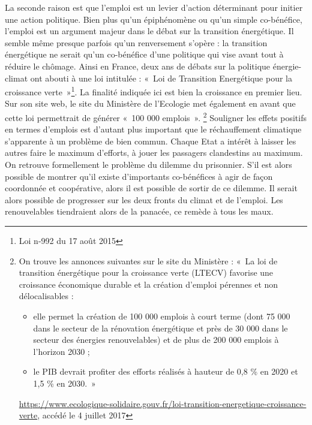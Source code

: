 La seconde raison est que l’emploi est un levier d’action déterminant pour initier une action politique. Bien plus qu’un épiphénomène ou qu’un simple co-bénéfice, l’emploi est un argument majeur dans le débat sur la transition énergétique. Il semble même presque parfois qu’un renversement s’opère : la transition énergétique ne serait qu’un co-bénéfice d’une politique qui vise avant tout à réduire le chômage. Ainsi en France, deux ans de débats sur la politique énergie-climat ont abouti à une loi intitulée : «~Loi de Transition Energétique pour la croissance verte~»\footnote{Loi n-992 du 17 août 2015
}. La finalité indiquée ici est bien la croissance en premier lieu. Sur son site web, le site du Ministère de l'Ecologie met également en avant que cette loi permettrait de générer «~100 000 emplois~». \footnote{On trouve les annonces suivantes sur le site du Ministère : «~La loi de transition énergétique pour la croissance verte (LTECV) favorise une croissance économique durable et la création d'emploi pérennes et non délocalisables :
\begin{itemize}
	\item elle permet la création de 100 000 emplois à court terme (dont 75 000 dans le secteur de la rénovation énergétique et près de 30 000 dans le secteur des énergies renouvelables) et de plus de 200 000 emplois à l’horizon 2030 ;
	\item le PIB devrait profiter des efforts réalisés à hauteur de 0,8 \% en 2020 et 1,5 \% en 2030.~»
\end{itemize}
\url{https://www.ecologique-solidaire.gouv.fr/loi-transition-energetique-croissance-verte}, accédé le 4 juillet 2017
}
Souligner les effets positifs en termes d’emplois est d’autant plus important que le réchauffement climatique s’apparente à un problème de bien commun. Chaque Etat a intérêt à laisser les autres faire le maximum d’efforts, à jouer les passagers clandestins au maximum. On retrouve formellement le problème du dilemme du prisonnier.
S’il est alors possible de montrer qu’il existe d’importants co-bénéfices à agir de façon coordonnée et coopérative, alors il est possible de sortir de ce dilemme. Il serait alors possible de progresser sur les deux fronts du climat et de l’emploi. Les renouvelables tiendraient alors de la panacée, ce remède à tous les maux. 


